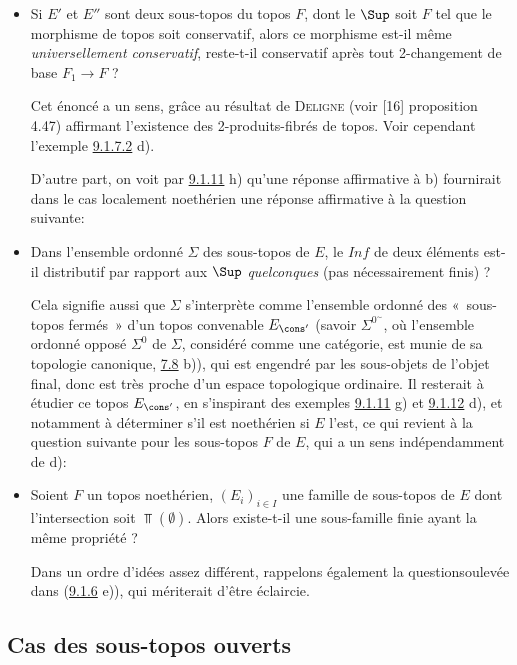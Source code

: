 \begin{itemize}
\item[c)] Si $E'$ et $E''$ sont deux sous-topos du topos $F$, dont le
$\Sup$ soit $F$ \ie tel que le morphisme de topos  soit
conservatif, alors ce morphisme est-il même \emph{universellement
conservatif}, \ie reste-t-il conservatif après tout 2-changement de
base $F_1\rightarrow F$ ?

Cet énoncé a un sens, grâce au résultat de \textsc{Deligne} (voir [16] proposition 4.47)
affirmant l'existence des 2-produits-fibrés de topos. Voir cependant
l'exemple \hyperref[IV.exer9.1.7.2]{9.1.7.2} d).

D'autre part, on voit par \hyperref[IV.exer9.1.11]{9.1.11} h) qu'une réponse
affirmative à b) fournirait dans le cas localement noethérien une
réponse affirmative à la question suivante:

\item[d)] Dans l'ensemble ordonné $\Sigma$ des sous-topos de $E$, le
$Inf$ de deux éléments est-il distributif par rapport aux $\Sup$
\emph{quelconques} (pas nécessairement finis) ?

Cela signifie aussi que $\Sigma$ s'interprète comme l'ensemble
ordonné des « sous-topos fermés »  d'un topos convenable
$E_{\cons'}$ (savoir $\Sigma^{0^{\sim}}$, où l'ensemble ordonné
opposé $\Sigma^0$ de $\Sigma$, considéré comme une
catégorie, est
munie de sa topologie canonique, \cf \hyperref[IV.exer7.8]{7.8} b)), qui est
engendré par les sous-objets de l'objet final, donc est très proche
d'un espace topologique ordinaire. Il resterait à étudier ce topos
$E_{\cons'}$, en s'inspirant des exemples \hyperref[IV.exer9.1.11]{9.1.11} g) et
\hyperref[IV.exer9.1.12]{9.1.12} d), et notamment à déterminer s'il est
noethérien si $E$ l'est, ce qui revient à la question suivante pour
les sous-topos $F$ de $E$, qui a un sens indépendamment de d):

\item[e)] Soient $F$ un topos noethérien, $(E_i)_{i\in I}$ une famille
de sous-topos de $E$ dont l'intersection soit $\Top(∅)$. Alors
existe-t-il une sous-famille finie ayant la même propriété ?

Dans un ordre d'idées assez différent, rappelons également la
question\pageoriginale soulevée dans (\hyperref[IV.exer9.1.6]{9.1.6} e)), qui
mériterait d'être éclaircie.
\end{itemize}

\subsection{Cas des sous-topos ouverts}

